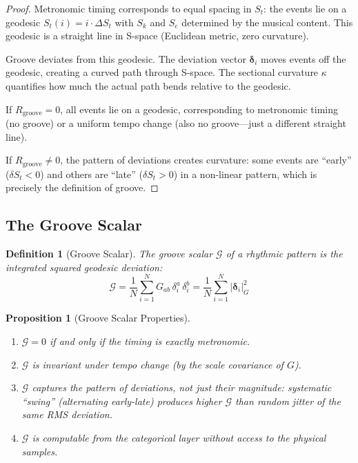 \documentclass[twocolumn,10pt]{article}
\newtheorem{proposition}[theorem]{Proposition}
\newtheorem{definition}[theorem]{Definition}
\theoremstyle{remark}
\newcommand{\Sk}{S_k}
\newcommand{\St}{S_t}
\newcommand{\Se}{S_e}
\newcommand{\calG}{\mathcal{G}}
\begin{document}
\begin{proof}
Metronomic timing corresponds to equal spacing in $\St$: the events lie on a geodesic $\St(i) = i \cdot \Delta\St$ with $\Sk$ and $\Se$ determined by the musical content. This geodesic is a straight line in S-space (Euclidean metric, zero curvature).

Groove deviates from this geodesic. The deviation vector $\boldsymbol{\delta}_i$ moves events off the geodesic, creating a curved path through S-space. The sectional curvature $\kappa$ quantifies how much the actual path bends relative to the geodesic.

If $R_{\mathrm{groove}} = 0$, all events lie on a geodesic, corresponding to metronomic timing (no groove) or a uniform tempo change (also no groove---just a different straight line).

If $R_{\mathrm{groove}} \neq 0$, the pattern of deviations creates curvature: some events are ``early'' ($\delta\St < 0$) and others are ``late'' ($\delta\St > 0$) in a non-linear pattern, which is precisely the definition of groove.
\end{proof}

\subsection{The Groove Scalar}

\begin{definition}[Groove Scalar]
\label{def:groove_scalar}
The groove scalar $\calG$ of a rhythmic pattern is the integrated squared geodesic deviation:
\begin{equation}
    \calG = \frac{1}{N} \sum_{i=1}^{N} G_{ab} \, \delta_i^a \, \delta_i^b = \frac{1}{N} \sum_{i=1}^{N} |\boldsymbol{\delta}_i|_G^2
    \label{eq:groove_scalar}
\end{equation}
\end{definition}

\begin{proposition}[Groove Scalar Properties]
\label{prop:groove_scalar_properties}
\begin{enumerate}
    \item $\calG = 0$ if and only if the timing is exactly metronomic.
    \item $\calG$ is invariant under tempo change (by the scale covariance of $G$).
    \item $\calG$ captures the \textit{pattern} of deviations, not just their magnitude: systematic ``swing'' (alternating early-late) produces higher $\calG$ than random jitter of the same RMS deviation.
    \item $\calG$ is computable from the categorical layer without access to the physical samples.
\end{enumerate}
\end{proposition}
\end{document}
